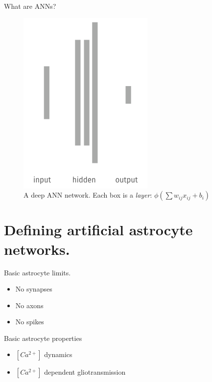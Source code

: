 \documentclass[10pt]{beamer}
\begin{document}
\begin{frame}[fragile]{What are ANNs?}
\begin{figure}
    \centering
    \includegraphics[scale=0.4]{images/deep.png}
    \caption{
    \alert{A deep ANN network}. Each box is a \textit{layer}: $\phi (\sum w_{ij} x_{ij} + b_i)$
    }
\end{figure}
\end{frame}

\section[AANs]{Defining artificial astrocyte networks.}

\begin{frame}[fragile]{Basic astrocyte limits.}
\begin{itemize}
    \item No synapses
    \item No axons 
    \item No spikes
\end{itemize}
\end{frame}


\begin{frame}[fragile]{Basic astrocyte properties}
\begin{itemize}
    \item $[Ca^{2+}]$ dynamics
    \item $[Ca^{2+}]$ dependent gliotransmission
\end{itemize}
\end{frame}
\end{document}
